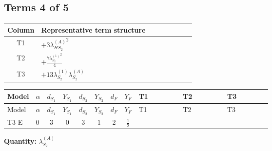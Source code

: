 \documentclass[8pt]{article}
\begin{document}
\begin{landscape}
\subsection*{Terms 4 of 5}
\begin{center}
\begin{tabular}{@{}c >{\raggedright\arraybackslash}p{0.82\linewidth}@{}}
\toprule
Column & Representative term structure \\
\midrule
T1 & \(\displaystyle +3 {\lambda_{HS_2}^{(A)}}^2\) \\
\midrule
T2 & \(\displaystyle +\frac{7 {\lambda_{S_2}^{(1)}}^2}{4}\) \\
\midrule
T3 & \(\displaystyle +13 {\lambda_{S_2}^{(1)}} {\lambda_{S_2}^{(A)}}\) \\
\midrule
\bottomrule
\end{tabular}
\end{center}
\smallskip
\tiny
\begin{longtable}{@{}llcccccc >{\raggedright\arraybackslash}p{0.21\linewidth} >{\raggedright\arraybackslash}p{0.21\linewidth} >{\raggedright\arraybackslash}p{0.21\linewidth}@{}}
\toprule
Model & $\alpha$ & $d_{S_1}$ & $Y_{S_1}$ & $d_{S_2}$ & $Y_{S_2}$ & $d_F$ & $Y_F$ & T1 & T2 & T3 \\
\midrule
\endfirsthead
\toprule
Model & $\alpha$ & $d_{S_1}$ & $Y_{S_1}$ & $d_{S_2}$ & $Y_{S_2}$ & $d_F$ & $Y_F$ & T1 & T2 & T3 \\
\midrule
\endhead
T3-E & $0$ & $3$ & $0$ & $3$ & $1$ & $2$ & $\frac{1}{2}$ & \scriptsize\adjustbox{max width=\linewidth}{$\begin{gathered} +3 {\lambda_{HS_2}^{(A)}}^2\end{gathered}$} & \scriptsize\adjustbox{max width=\linewidth}{$\begin{gathered} +\frac{7 {\lambda_{S_2}^{(1)}}^2}{4}\end{gathered}$} & \scriptsize\adjustbox{max width=\linewidth}{$\begin{gathered} +13 {\lambda_{S_2}^{(1)}} {\lambda_{S_2}^{(A)}}\end{gathered}$} \\
\midrule
\bottomrule
\end{longtable}
\clearpage
\noindent\textbf{Quantity: }$\lambda_{S_2}^{(A)}$\par\smallskip

\end{landscape}
\end{document}
